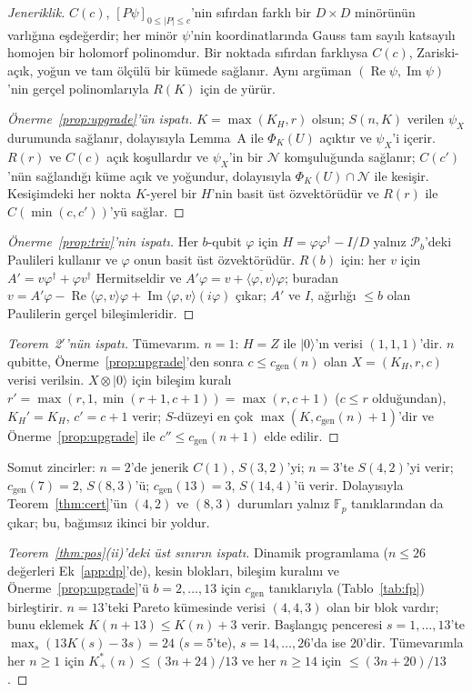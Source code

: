\documentclass[aps,pra,onecolumn,superscriptaddress,nofootinbib,longbibliography,10pt]{revtex4-2}
\theoremstyle{definition}
\newcommand{\FF}{\mathbb F}
\newcommand{\Kp}{K^{*}_{+}}
\newcommand{\cgen}{c_{\mathrm{gen}}}
\begin{document}
\noindent \emph{Jeneriklik.} $C(c)$, $[P\psi]_{0\le|P|\le c}$'nin sıfırdan farklı bir $D\times D$ minörünün varlığına eşdeğerdir; her minör $\psi$'nin koordinatlarında Gauss tam sayılı katsayılı homojen bir holomorf polinomdur. Bir noktada sıfırdan farklıysa $C(c)$, Zariski-açık, yoğun ve tam ölçülü bir kümede sağlanır. Aynı argüman $(\operatorname{Re}\psi,\operatorname{Im}\psi)$'nin gerçel polinomlarıyla $R(K)$ için de yürür.

\begin{proof}[Önerme~\ref{prop:upgrade}'ün ispatı]
$K=\max(K_H,r)$ olsun; $S(n,K)$ verilen $\psi_X$ durumunda sağlanır, dolayısıyla Lemma~A ile $\Phi_K(U)$ açıktır ve $\psi_X$'i içerir. $R(r)$ ve $C(c)$ açık koşullardır ve $\psi_X$'in bir $\mathcal N$ komşuluğunda sağlanır; $C(c')$'nün sağlandığı küme açık ve yoğundur, dolayısıyla $\Phi_K(U)\cap\mathcal N$ ile kesişir. Kesişimdeki her nokta $K$-yerel bir $H$'nin basit üst özvektörüdür ve $R(r)$ ile $C(\min(c,c'))$'yü sağlar.
\end{proof}
\begin{proof}[Önerme~\ref{prop:triv}'nin ispatı]
Her $b$-qubit $\varphi$ için $H=\varphi\varphi^\dagger-I/D$ yalnız $\mathcal P_b$'deki Paulileri kullanır ve $\varphi$ onun basit üst özvektörüdür. $R(b)$ için: her $v$ için $A'=v\varphi^\dagger+\varphi v^\dagger$ Hermitseldir ve $A'\varphi=v+\overline{\langle\varphi,v\rangle}\varphi$; buradan $v=A'\varphi-\operatorname{Re}\langle\varphi,v\rangle\varphi+\operatorname{Im}\langle\varphi,v\rangle(i\varphi)$ çıkar; $A'$ ve $I$, ağırlığı $\le b$ olan Paulilerin gerçel bileşimleridir.
\end{proof}

\begin{proof}[Teorem~2$'$'nün ispatı]
Tümevarım. $n=1$: $H=Z$ ile $|0\rangle$'ın verisi $(1{,}1{,}1)$'dir. $n$ qubitte, Önerme~\ref{prop:upgrade}'den sonra $c\le\cgen(n)$ olan $X=(K_H,r,c)$ verisi verilsin. $X\otimes|0\rangle$ için bileşim kuralı $r'=\max(r,1,\min(r+1,c+1))=\max(r,c+1)$ ($c\le r$ olduğundan), $K_H'=K_H$, $c'=c+1$ verir; $S$-düzeyi en çok $\max(K,\cgen(n)+1)$'dir ve Önerme~\ref{prop:upgrade} ile $c''\le\cgen(n+1)$ elde edilir.
\end{proof}
\noindent Somut zincirler: $n=2$'de jenerik $C(1)$, $S(3{,}2)$'yi; $n=3$'te $S(4{,}2)$'yi verir; $\cgen(7)=2$, $S(8{,}3)$'ü; $\cgen(13)=3$, $S(14{,}4)$'ü verir. Dolayısıyla Teorem~\ref{thm:cert}'ün $(4, 2)$ ve $(8, 3)$ durumları yalnız $\FF_p$ tanıklarından da çıkar; bu, bağımsız ikinci bir yoldur.

\begin{proof}[Teorem~\ref{thm:pos}(ii)'deki üst sınırın ispatı]
Dinamik programlama ($n\le26$ değerleri Ek~\ref{app:dp}'de), kesin blokları, bileşim kuralını ve Önerme~\ref{prop:upgrade}'ü $b=2,\dots,13$ için $\cgen$ tanıklarıyla (Tablo~\ref{tab:fp}) birleştirir. $n=13$'teki Pareto kümesinde verisi $(4{,}4{,}3)$ olan bir blok vardır; bunu eklemek $K(n+13)\le K(n)+3$ verir. Başlangıç penceresi $s=1,\dots,13$'te $\max_s(13K(s)-3s)=24$ ($s=5$'te), $s=14,\dots,26$'da ise $20$'dir. Tümevarımla her $n\ge1$ için $\Kp(n)\le(3n+24)/13$ ve her $n\ge14$ için $\le(3n+20)/13$.
\end{proof}
\end{document}
